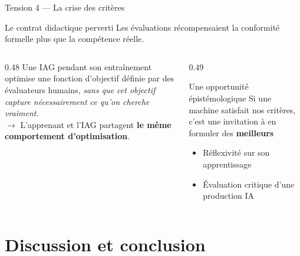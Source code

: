 \begin{frame}{Tension 4 --- La crise des critères}
  \begin{block}{Le contrat didactique perverti}
    Les évaluations récompensaient la conformité formelle
    plus que la compétence réelle.
  \end{block}

  \vspace{0.5em}

  \begin{columns}[T]
    \begin{column}{0.48\textwidth}
      Une IAG pendant son entraînement optimise
      une fonction d'objectif définie par des
      évaluateurs humains, \emph{sans que cet objectif
      capture nécessairement ce qu'on cherche vraiment}.\\[0.3em]
      \(\rightarrow\) L'apprenant et l'IAG partagent
      \textbf{le même comportement d'optimisation}.
    \end{column}
    \begin{column}{0.49\textwidth}
      \begin{alertblock}{Une opportunité épistémologique}
        Si une machine satisfait nos critères,
        c'est une invitation à en formuler des
        \textbf{meilleurs}
        \begin{itemize}
          \item Réflexivité sur son apprentissage
          \item Évaluation critique d'une production IA
        \end{itemize}
      \end{alertblock}
    \end{column}
  \end{columns}
\end{frame}

\section{Discussion et conclusion}

